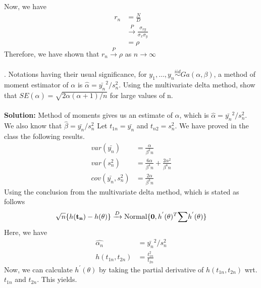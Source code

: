 \documentclass[11pt]{article}
\begin{document}
Now, we have
\begin{equation}
  \nonumber
  \begin{aligned}
    r_{n} & = \frac{N}{D}\\
    & \xrightarrow{P} \frac{\sigma_{xy}}{\sigma_{x}\sigma_{y}}\\
    & = \rho
  \end{aligned}
\end{equation}
Therefore, we have shown that $r_{n} \xrightarrow{P} \rho$ as $n \xrightarrow{} \infty$
\\ \\
. Notations having their usual significance, for $y_{1}, \dots, y_{n} \overset{iid}\sim Ga(\alpha, \beta)$, a method of moment estimator of $\alpha$ is $\hat{\alpha} = \bar{y_{n}}^{2}/s_{n}^{2}$. Using the multivariate delta method, show that $SE(\hat{\alpha}) = \sqrt{2\alpha(\alpha+1)/n}$ for large values of n.\\ \\
\textbf{Solution:} Method of moments gives us an estimate of $\alpha$, which is $\hat{\alpha} = \bar{y_{n}}^{2}/s_{n}^{2}$. We also know that $\hat{\beta} = \bar{y_{n}}/s_{n}^{2}$ Let $t_{1n} = \bar{y_{n}}$ and $t_{n2} = s_{n}^{2}$. We have proved in the class the following results.
\begin{equation}
  \nonumber
  \begin{aligned}
    var(\bar{y_{n}}) & = \frac{\alpha}{\beta^{2}n}\\
    var(s_{n}^{2}) & = \frac{6\alpha}{\beta^{4}n} + \frac{2\alpha^{2}}{\beta^{4}n}\\
    cov(\bar{y_{n}}, s_{n}^{2}) & = \frac{2\alpha}{\beta^{3}n}
  \end{aligned}
\end{equation}
Using the conclusion from the multivariate delta method, which is stated as follows
\begin{equation}
  \nonumber
  \sqrt{n}\{h(\mathbf{t_{n}}) - h(\mathbf{\theta})\} \xrightarrow{D} \text{Normal}\{\mathbf{0}, h^{'}(\mathbf{\theta})^{T}\mathbf{\text{$ \sum$}}h^{'}(\mathbf{\theta})\}
\end{equation}
Here, we have
\begin{equation}
  \nonumber
  \begin{aligned}
    \hat{\alpha_{n}} & = \bar{y_{n}}^{2}/s_{n}^{2}\\
    h(t_{1n}, t_{2n}) & = \frac{t_{1n}^{2}}{t_{2n}}
  \end{aligned}
\end{equation}
Now, we can calculate $h^{'}(\theta)$ by taking the partial derivative of $h(t_{1n}, t_{2n})$ wrt. $t_{1n}$ and $t_{2n}$. This yields.
\end{document}
